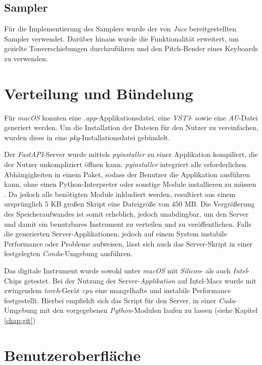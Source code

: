 \documentclass[
  a4paper,  %
  twoside,  %
  bibliography=totoc,
  headsepline,
  cleardoublepage=empty,
  parskip=half,
  draft=false
]{scrbook}
\begin{document}
{\subsection{Sampler}

Für die Implementierung des Samplers wurde der von \emph{Juce} bereitgestellten Sampler \cite{noauthor_sampler_nodate} verwendet. Darüber hinaus wurde die Funktionalität erweitert, um gezielte Tonverschiebungen durchzuführen und den Pitch-Bender eines Keyboards zu verwenden.

\section{Verteilung und Bündelung}

Für \emph{macOS} konnten eine \emph{.app}-Applikationsdatei, eine \emph{VST3}- sowie eine \emph{AU}-Datei generiert werden. Um die Installation der Dateien für den Nutzer zu vereinfachen, wurden diese in eine \emph{pkg}-Installationsdatei gebündelt. 

Der \emph{FastAPI}-Server wurde mittels \emph{pyinstaller} \cite{noauthor_pyinstaller_nodate} zu einer Applikation kompiliert, die der Nutzer unkompliziert öffnen kann. \emph{pyinstaller} integriert alle erforderlichen Abhängigkeiten in einem Paket, sodass der Benutzer die Applikation ausführen kann, ohne einen Python-Interpreter oder sonstige Module installieren zu müssen \cite{noauthor_pyinstaller_nodate}. Da jedoch alle benötigten Module inkludiert werden, resultiert aus einem ursprünglich $5$ KB großen Skript eine Dateigröße von $450$ MB. Die Vergrößerung des Speicheraufwandes ist somit erheblich, jedoch unabdingbar, um den Server und damit ein benutzbares Instrument zu verteilen und zu veröffentlichen. Falls die generierten Server-Applikationen, jedoch auf einem System instabile Performance oder Probleme aufweisen, lässt sich auch das Server-Skript in einer festgelegten \emph{Conda}-Umgebung ausführen. 

Das digitale Instrument wurde sowohl unter \emph{macOS} mit \emph{Silicon}- als auch \emph{Intel}-Chips getestet. Bei der Nutzung der Server-\emph{Applikation} auf Intel-Macs wurde mit zwingendem \emph{torch}-Gerät \emph{cpu} eine mangelhafte und instabile Performance festgestellt. Hierbei empfiehlt sich das Script für den Server, in einer \emph{Cuda}-Umgebung mit den vorgegebenen \emph{Python}-Modulen laufen zu lassen (siehe Kapitel \ref{chap:git})

\section{Benutzeroberfläche}

}
\end{document}
